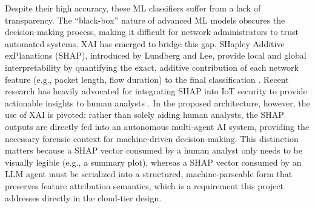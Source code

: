 Despite their high accuracy, these ML classifiers suffer from a lack of transparency. The ``black-box'' nature of advanced ML models obscures the decision-making process, making it difficult for network administrators to trust automated systems. XAI has emerged to bridge this gap. SHapley Additive exPlanations (SHAP), introduced by Lundberg and Lee, provide local and global interpretability by quantifying the exact, additive contribution of each network feature (e.g., packet length, flow duration) to the final classification \cite{Lundberg2017}. Recent research has heavily advocated for integrating SHAP into IoT security to provide actionable insights to human analysts \cite{Ogunseyi2026}. In the proposed architecture, however, the use of XAI is pivoted: rather than solely aiding human analysts, the SHAP outputs are directly fed into an autonomous multi-agent AI system, providing the necessary forensic context for machine-driven decision-making. This distinction matters because a SHAP vector consumed by a human analyst only needs to be visually legible (e.g., a summary plot), whereas a SHAP vector consumed by an LLM agent must be serialized into a structured, machine-parseable form that preserves feature attribution semantics, which is a requirement this project addresses directly in the cloud-tier design.

